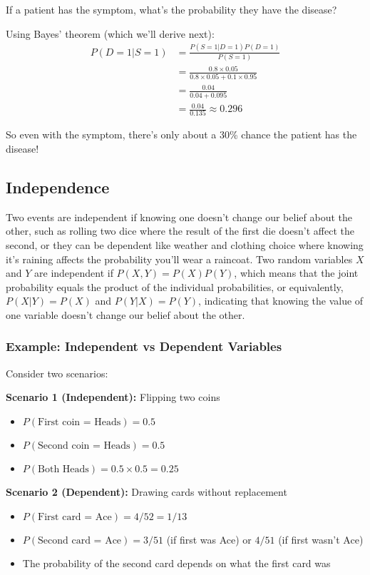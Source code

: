 If a patient has the symptom, what's the probability they have the disease?

Using Bayes' theorem (which we'll derive next):
\begin{align}
P(D=1|S=1) &= \frac{P(S=1|D=1)P(D=1)}{P(S=1)} \\
&= \frac{0.8 \times 0.05}{0.8 \times 0.05 + 0.1 \times 0.95} \\
&= \frac{0.04}{0.04 + 0.095} \\
&= \frac{0.04}{0.135} \approx 0.296
\end{align}

So even with the symptom, there's only about a 30\% chance the patient has the disease!

\subsection{Independence}

Two events are independent if knowing one doesn't change our belief about the other, such as rolling two dice where the result of the first die doesn't affect the second, or they can be dependent like weather and clothing choice where knowing it's raining affects the probability you'll wear a raincoat. Two random variables $X$ and $Y$ are independent if $P(X, Y) = P(X)P(Y)$, which means that the joint probability equals the product of the individual probabilities, or equivalently, $P(X|Y) = P(X)$ and $P(Y|X) = P(Y)$, indicating that knowing the value of one variable doesn't change our belief about the other.

\subsubsection{Example: Independent vs Dependent Variables}

Consider two scenarios:

\textbf{Scenario 1 (Independent):} Flipping two coins
\begin{itemize}
    \item $P(\text{First coin = Heads}) = 0.5$
    \item $P(\text{Second coin = Heads}) = 0.5$
    \item $P(\text{Both Heads}) = 0.5 \times 0.5 = 0.25$ \checkmark
\end{itemize}

\textbf{Scenario 2 (Dependent):} Drawing cards without replacement
\begin{itemize}
    \item $P(\text{First card = Ace}) = 4/52 = 1/13$
    \item $P(\text{Second card = Ace}) = 3/51$ (if first was Ace) or $4/51$ (if first wasn't Ace)
    \item The probability of the second card depends on what the first card was
\end{itemize}

